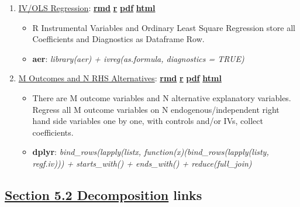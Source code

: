 \documentclass[
]{book}
\providecommand{\tightlist}{%
  \setlength{\itemsep}{0pt}\setlength{\parskip}{0pt}}
\begin{document}
\begin{enumerate}
\def\labelenumi{\arabic{enumi}.}
\tightlist
\item
  \href{https://fanwangecon.github.io/R4Econ/linreg/ivreg/htmlpdfr/fs_lin_ivregrow.html}{IV/OLS Regression}: \href{https://github.com/FanWangEcon/R4Econ/blob/master/linreg/ivreg//fs_lin_ivregrow.Rmd}{\textbf{rmd}} \textbar{} \href{https://github.com/FanWangEcon/R4Econ/blob/master/linreg/ivreg/htmlpdfr/fs_lin_ivregrow.R}{\textbf{r}} \textbar{} \href{https://github.com/FanWangEcon/R4Econ/blob/master/linreg/ivreg/htmlpdfr/fs_lin_ivregrow.pdf}{\textbf{pdf}} \textbar{} \href{https://fanwangecon.github.io/R4Econ/linreg/ivreg/htmlpdfr/fs_lin_ivregrow.html}{\textbf{html}}

  \begin{itemize}
  \tightlist
  \item
    R Instrumental Variables and Ordinary Least Square Regression store all Coefficients and Diagnostics as Dataframe Row.
  \item
    \textbf{aer}: \emph{library(aer) + ivreg(as.formula, diagnostics = TRUE) }
  \end{itemize}
\item
  \href{https://fanwangecon.github.io/R4Econ/linreg/ivreg/htmlpdfr/fs_lin_ivloop.html}{M Outcomes and N RHS Alternatives}: \href{https://github.com/FanWangEcon/R4Econ/blob/master/linreg/ivreg//fs_lin_ivloop.Rmd}{\textbf{rmd}} \textbar{} \href{https://github.com/FanWangEcon/R4Econ/blob/master/linreg/ivreg/htmlpdfr/fs_lin_ivloop.R}{\textbf{r}} \textbar{} \href{https://github.com/FanWangEcon/R4Econ/blob/master/linreg/ivreg/htmlpdfr/fs_lin_ivloop.pdf}{\textbf{pdf}} \textbar{} \href{https://fanwangecon.github.io/R4Econ/linreg/ivreg/htmlpdfr/fs_lin_ivloop.html}{\textbf{html}}

  \begin{itemize}
  \tightlist
  \item
    There are M outcome variables and N alternative explanatory variables. Regress all M outcome variables on N endogenous/independent right hand side variables one by one, with controls and/or IVs, collect coefficients.
  \item
    \textbf{dplyr}: \emph{bind\_rows(lapply(listx, function(x)(bind\_rows(lapply(listy, regf.iv))) + starts\_with() + ends\_with() + reduce(full\_join)}
  \end{itemize}
\end{enumerate}

\hypertarget{section-5.2-decompositiondecomposition-links}{%
\subsection{\texorpdfstring{\protect\hyperlink{decomposition}{Section 5.2 Decomposition} links}{Section 5.2 Decomposition links}}\label{section-5.2-decompositiondecomposition-links}}
\end{document}
